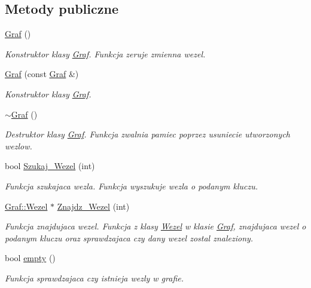 \subsection*{\-Metody publiczne}
\begin{DoxyCompactItemize}
\item 
\hyperlink{class_graf_a05a504069321858769df57555045d808}{\-Graf} ()
\begin{DoxyCompactList}\small\item\em \-Konstruktor klasy \hyperlink{class_graf}{\-Graf}. \-Funkcja zeruje zmienna wezel. \end{DoxyCompactList}\item 
\hyperlink{class_graf_aedb6daaad2182cab92ca02111585ac3f}{\-Graf} (const \hyperlink{class_graf}{\-Graf} \&)
\begin{DoxyCompactList}\small\item\em \-Konstruktor klasy \hyperlink{class_graf}{\-Graf}. \end{DoxyCompactList}\item 
\hyperlink{class_graf_a4ff3904fd04f367ac0219b52719c567e}{$\sim$\-Graf} ()
\begin{DoxyCompactList}\small\item\em \-Destruktor klasy \hyperlink{class_graf}{\-Graf}. \-Funkcja zwalnia pamiec poprzez usuniecie utworzonych wezlow. \end{DoxyCompactList}\item 
bool \hyperlink{class_graf_ada96a79ee31368459870c750da454980}{\-Szukaj\-\_\-\-Wezel} (int)
\begin{DoxyCompactList}\small\item\em \-Funkcja szukajaca wezla. \-Funkcja wyszukuje wezla o podanym kluczu. \end{DoxyCompactList}\item 
\hyperlink{class_graf_1_1_wezel}{\-Graf\-::\-Wezel} $\ast$ \hyperlink{class_graf_a098635fa014ba2abf86254fe08751971}{\-Znajdz\-\_\-\-Wezel} (int)
\begin{DoxyCompactList}\small\item\em \-Funkcja znajdujaca wezel. \-Funkcja z klasy \hyperlink{class_graf_1_1_wezel}{\-Wezel} w klasie \hyperlink{class_graf}{\-Graf}, znajdujaca wezel o podanym kluczu oraz sprawdzajaca czy dany wezel zostal znaleziony. \end{DoxyCompactList}\item 
bool \hyperlink{class_graf_a982895b4684becfc56f7450bdb4994ff}{empty} ()
\begin{DoxyCompactList}\small\item\em \-Funkcja sprawdzajaca czy istnieja wezly w grafie. \end{DoxyCompactList}\item 

\end{DoxyCompactItemize}
